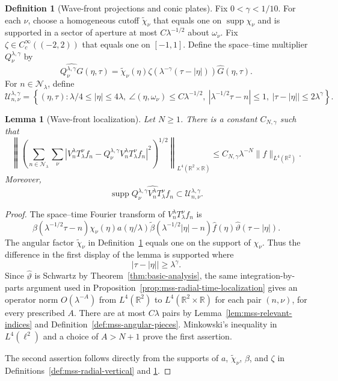 \documentclass[11pt]{article}
\numberwithin{equation}{section}
\newtheorem{lemma}[theorem]{Lemma}
\theoremstyle{definition}
\newtheorem{definition}[theorem]{Definition}
\theoremstyle{remark}
\newcommand{\R}{\mathbb R}
\newcommand{\supp}{\operatorname{supp}}
\begin{document}
\begin{definition}[Wave-front projections and conic plates]\label{def:mss-wavefront-plates}
Fix $0<\gamma<1/10$.  For each $\nu$, choose a homogeneous cutoff $\widetilde\chi_\nu$ that equals one on $\supp\chi_\nu$ and is supported in a sector of aperture at most $C\lambda^{-1/2}$ about $\omega_\nu$.  Fix $\zeta\in C_c^\infty((-2,2))$ that equals one on $[-1,1]$.  Define the space--time multiplier $Q_\nu^{\lambda,\gamma}$ by
\[
\widehat{Q_\nu^{\lambda,\gamma}G}(\eta,\tau)
=\widetilde\chi_\nu(\eta)
\zeta(\lambda^{-\gamma}(\tau-|\eta|))\widehat G(\eta,\tau).
\]
For $n\in\mathcal N_\lambda$, define
\[
\mathcal U_{n,\nu}^{\lambda,\gamma}
=\left\{(\eta,\tau):
\lambda/4\le|\eta|\le4\lambda,
\ \angle(\eta,\omega_\nu)\le C\lambda^{-1/2},
\ |\lambda^{-1/2}\tau-n|\le1,
\ |\tau-|\eta||\le2\lambda^\gamma
\right\}.
\]
\end{definition}

\begin{lemma}[Wave-front localization]\label{lem:mss-wavefront-localization}
Let $N\ge1$.  There is a constant $C_{N,\gamma}$ such that
\[
\left\|
\left(\sum_{n\in\mathcal N_\lambda}\sum_\nu
\left|
V_n^\lambda T_\lambda^\nu f_n
-Q_\nu^{\lambda,\gamma}V_n^\lambda T_\lambda^\nu f_n
\right|^2\right)^{1/2}
\right\|_{L^4(\R^2\times\R)}
\le C_{N,\gamma}\lambda^{-N}\|f\|_{L^4(\R^2)}.
\]
Moreover,
\[
\supp\widehat{Q_\nu^{\lambda,\gamma}V_n^\lambda T_\lambda^\nu f_n}
\subset\mathcal U_{n,\nu}^{\lambda,\gamma}.
\]
\end{lemma}

\begin{proof}
The space--time Fourier transform of $V_n^\lambda T_\lambda^\nu f_n$ is
\[
\beta(\lambda^{-1/2}\tau-n)
\chi_\nu(\eta)a(\eta/\lambda)
\widetilde\beta(\lambda^{-1/2}|\eta|-n)
\widehat f(\eta)\widehat\vartheta(\tau-|\eta|).
\]
The angular factor $\widetilde\chi_\nu$ in Definition~\ref{def:mss-wavefront-plates} equals one on the support of $\chi_\nu$.  Thus the difference in the first display of the lemma is supported where
\[
|\tau-|\eta||\ge\lambda^\gamma.
\]
Since $\widehat\vartheta$ is Schwartz by Theorem~\ref{thm:basic-analysis}, the same integration-by-parts argument used in Proposition~\ref{prop:mss-radial-time-localization} gives an operator norm $O(\lambda^{-A})$ from $L^4(\R^2)$ to $L^4(\R^2\times\R)$ for each pair $(n,\nu)$, for every prescribed $A$.  There are at most $C\lambda$ pairs by Lemma~\ref{lem:mss-relevant-indices} and Definition~\ref{def:mss-angular-pieces}.  Minkowski's inequality in $L^4(\ell^2)$ and a choice of $A>N+1$ prove the first assertion.

The second assertion follows directly from the supports of $a$, $\widetilde\chi_\nu$, $\beta$, and $\zeta$ in Definitions~\ref{def:mss-radial-vertical} and \ref{def:mss-wavefront-plates}.
\end{proof}
\end{document}
